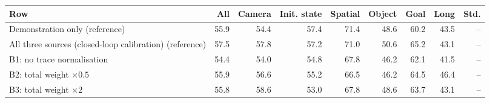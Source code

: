 \begin{tabular}{lrrrrrrrr}
\toprule
Row & All & Camera & Init. state & Spatial & Object & Goal & Long & Std. \\
\midrule
Demonstration only (reference) & 55.9 & 54.4 & 57.4 & 71.4 & 48.6 & 60.2 & 43.5 & -- \\
All three sources (closed-loop calibration) (reference) & 57.5 & 57.8 & 57.2 & 71.0 & 50.6 & 65.2 & 43.1 & -- \\
B1: no trace normalisation & 54.4 & 54.0 & 54.8 & 67.8 & 46.2 & 62.1 & 41.5 & -- \\
B2: total weight $\times 0.5$ & 55.9 & 56.6 & 55.2 & 66.5 & 46.2 & 64.5 & 46.4 & -- \\
B3: total weight $\times 2$ & 55.8 & 58.6 & 53.0 & 67.8 & 48.6 & 63.7 & 43.1 & -- \\
\bottomrule
\end{tabular}
